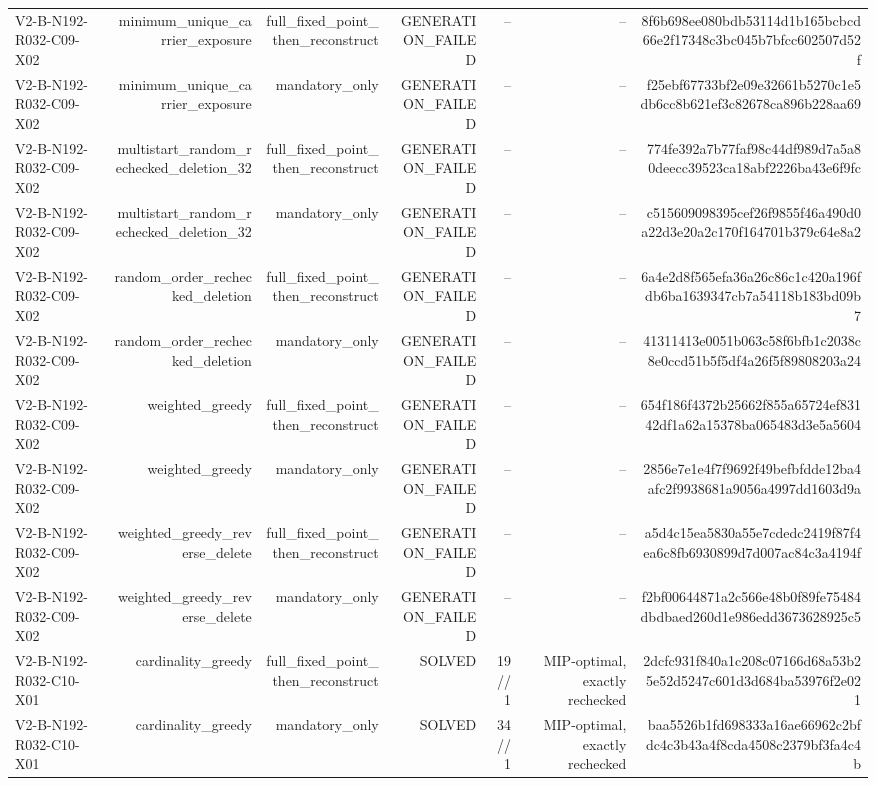{\begin{longtable}{lrrrrrr}
V2-B-N192-R032-C09-X02 & minimum\_unique\_carrier\_exposure & full\_fixed\_point\_then\_reconstruct & GENERATION\_FAILED & -- & -- & 8f6b698ee080bdb53114d1b165bcbcd66e2f17348c3bc045b7bfcc602507d52f \\
V2-B-N192-R032-C09-X02 & minimum\_unique\_carrier\_exposure & mandatory\_only & GENERATION\_FAILED & -- & -- & f25ebf67733bf2e09e32661b5270c1e5db6cc8b621ef3c82678ca896b228aa69 \\
V2-B-N192-R032-C09-X02 & multistart\_random\_rechecked\_deletion\_32 & full\_fixed\_point\_then\_reconstruct & GENERATION\_FAILED & -- & -- & 774fe392a7b77faf98c44df989d7a5a80deecc39523ca18abf2226ba43e6f9fc \\
V2-B-N192-R032-C09-X02 & multistart\_random\_rechecked\_deletion\_32 & mandatory\_only & GENERATION\_FAILED & -- & -- & c515609098395cef26f9855f46a490d0a22d3e20a2c170f164701b379c64e8a2 \\
V2-B-N192-R032-C09-X02 & random\_order\_rechecked\_deletion & full\_fixed\_point\_then\_reconstruct & GENERATION\_FAILED & -- & -- & 6a4e2d8f565efa36a26c86c1c420a196fdb6ba1639347cb7a54118b183bd09b7 \\
V2-B-N192-R032-C09-X02 & random\_order\_rechecked\_deletion & mandatory\_only & GENERATION\_FAILED & -- & -- & 41311413e0051b063c58f6bfb1c2038c8e0ccd51b5f5df4a26f5f89808203a24 \\
V2-B-N192-R032-C09-X02 & weighted\_greedy & full\_fixed\_point\_then\_reconstruct & GENERATION\_FAILED & -- & -- & 654f186f4372b25662f855a65724ef83142df1a62a15378ba065483d3e5a5604 \\
V2-B-N192-R032-C09-X02 & weighted\_greedy & mandatory\_only & GENERATION\_FAILED & -- & -- & 2856e7e1e4f7f9692f49befbfdde12ba4afc2f9938681a9056a4997dd1603d9a \\
V2-B-N192-R032-C09-X02 & weighted\_greedy\_reverse\_delete & full\_fixed\_point\_then\_reconstruct & GENERATION\_FAILED & -- & -- & a5d4c15ea5830a55e7cdedc2419f87f4ea6c8fb6930899d7d007ac84c3a4194f \\
V2-B-N192-R032-C09-X02 & weighted\_greedy\_reverse\_delete & mandatory\_only & GENERATION\_FAILED & -- & -- & f2bf00644871a2c566e48b0f89fe75484dbdbaed260d1e986edd3673628925c5 \\
V2-B-N192-R032-C10-X01 & cardinality\_greedy & full\_fixed\_point\_then\_reconstruct & SOLVED & 19//1 & MIP-optimal, exactly rechecked & 2dcfc931f840a1c208c07166d68a53b25e52d5247c601d3d684ba53976f2e021 \\
V2-B-N192-R032-C10-X01 & cardinality\_greedy & mandatory\_only & SOLVED & 34//1 & MIP-optimal, exactly rechecked & baa5526b1fd698333a16ae66962c2bfdc4c3b43a4f8cda4508c2379bf3fa4c4b \\

\end{longtable}}
